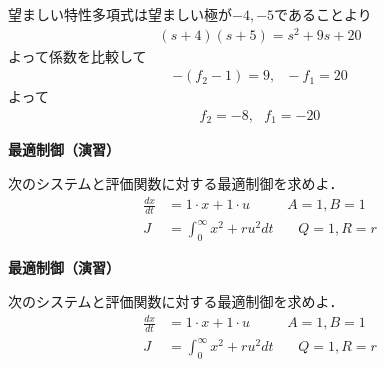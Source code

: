 \documentclass[a4paper,11pt]{jreport}
\begin{document}
望ましい特性多項式は望ましい極が$-4,-5$であることより
\begin{align*}
	(s+4)(s+5) = s^2 + 9s + 20
\end{align*}
よって係数を比較して
\begin{align*}
	-(f_2-1)=9, \ \ \ -f_1=20
\end{align*}
よって
\begin{align*}
	f_2=-8, \ \ \ f_1=-20
\end{align*}

\newpage

\noindent
{\bf 最適制御（演習）}

次のシステムと評価関数に対する最適制御を求めよ．
\begin{align*}
	\frac{dx}{dt} & = 1 \cdot x + 1 \cdot u \ \ \ \ \ \ \ \ \ \ \ \ A=1,B=1\\
	J & = \int_0^{\infty} x^2 + r u^2 dt \ \ \ \ \ \ \ \ Q=1,R=r
\end{align*}


\newpage

\noindent
{\bf 最適制御（演習）}

次のシステムと評価関数に対する最適制御を求めよ．
\begin{align*}
	\frac{dx}{dt} & = 1 \cdot x + 1 \cdot u \ \ \ \ \ \ \ \ \ \ \ \ A=1,B=1\\
	J & = \int_0^{\infty} x^2 + r u^2 dt \ \ \ \ \ \ \ \ Q=1,R=r
\end{align*}
\end{document}
